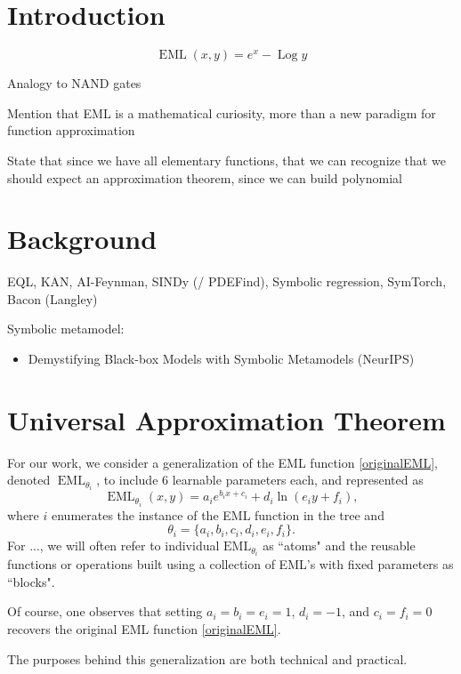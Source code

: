 \documentclass{article}
\numberwithin{Def}{section}
\newcommand{\eml}[2]{\operatorname{EML}({#1}, {#2})}
\newcommand{\emlTheta}[2]{\operatorname{EML}_{\theta_i}({#1}, {#2})}
\DeclareMathOperator{\Log}{Log}
\begin{document}
\section{Introduction}
\begin{equation}
\label{originalEML}
    \eml{x}{y} = e^x - \Log y
\end{equation}

Analogy to NAND gates

Mention that EML is a mathematical curiosity, more than a new paradigm for function approximation

State that since we have all elementary functions, that we can recognize that we should expect an approximation theorem, since we can build polynomial

\section{Background}
EQL, KAN, AI-Feynman, SINDy (/ PDEFind), Symbolic regression, SymTorch, Bacon (Langley)

Symbolic metamodel: 
\begin{itemize}
    \item Demystifying Black-box Models with Symbolic Metamodels (NeurIPS)
\end{itemize}

\section{Universal Approximation Theorem}
For our work, we consider a generalization of the EML function \eqref{originalEML}, denoted $\operatorname{EML}_{\theta_i}$, to include $6$ learnable parameters each, and represented as
\begin{equation}
    \emlTheta{x}{y} = a_i e^{b_i x + c_i} + d_i \ln (e_i y + f_i),
\end{equation}
where $i$ enumerates the instance of the EML function in the tree and
\begin{equation}
    \theta_i = \{a_i, b_i, c_i, d_i, e_i, f_i \}.
\end{equation}
For ..., we will often refer to individual $\text{EML}_{\theta_i}$ as ``atoms" and the reusable functions or operations built using a collection of EML's with fixed parameters as ``blocks". 

Of course, one observes that setting $a_i = b_i = e_i = 1$, $d_i = -1$, and $c_i = f_i = 0$ recovers the original EML function \eqref{originalEML}.

The purposes behind this generalization are both technical and practical. 
\end{document}
